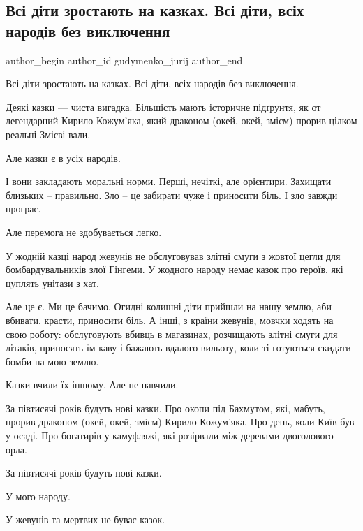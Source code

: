  
 
 
 
 

\subsection{Всі діти зростають на казках. Всі діти, всіх народів без виключення}
\label{sec:04_01_2023.fb.gudymenko_jurij.1.vs__d_ti_zrostayut_n}

\ifcmt
 author_begin
   author_id gudymenko_jurij
 author_end
\fi

Всі діти зростають на казках. Всі діти, всіх народів без виключення.

Деякі казки — чиста вигадка. Більшість мають історичне підґрунтя, як от
легендарний Кирило Кожум’яка, який драконом (окей, окей, змієм) прорив цілком
реальні Змієві вали. 

Але казки є в усіх народів.

І вони закладають моральні норми. Перші, нечіткі, але орієнтири. Захищати
близьких – правильно. Зло – це забирати чуже і приносити біль. І зло завжди
програє.

Але перемога не здобувається легко.

У жодній казці народ жевунів не обслуговував злітні смуги з жовтої цегли для
бомбардувальників злої Гінгеми. У жодного народу немає казок про героїв, які
цуплять унітази з хат. 

Але це є. Ми це бачимо. Огидні колишні діти прийшли на нашу землю, аби вбивати,
красти, приносити біль. А інші, з країни жевунів, мовчки ходять на свою роботу:
обслуговують вбивць в магазинах, розчищають злітні смуги для літаків, приносять
їм каву і бажають вдалого вильоту, коли ті готуються скидати бомби на мою
землю.

Казки вчили їх іншому. Але не навчили.

За півтисячі років будуть нові казки. Про окопи під Бахмутом, які, мабуть,
прорив драконом (окей, окей, змієм) Кирило Кожум'яка. Про день, коли Київ був у
осаді. Про богатирів у камуфляжі, які розірвали між деревами двоголового орла. 

За півтисячі років будуть нові казки. 

У мого народу. 

У жевунів та мертвих не буває казок.

